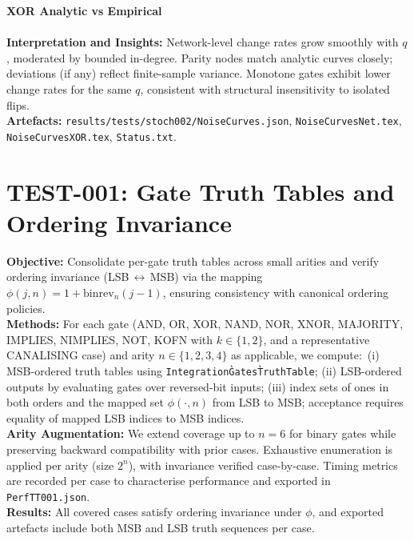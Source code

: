\documentclass{article}
\begin{document}
\textbf{XOR Analytic vs Empirical}\\
\\
\textbf{Interpretation and Insights:} Network-level change rates grow smoothly with \(q\), moderated by bounded in-degree. Parity nodes match analytic curves closely; deviations (if any) reflect finite-sample variance. Monotone gates exhibit lower change rates for the same \(q\), consistent with structural insensitivity to isolated flips.\\
\textbf{Artefacts:} \texttt{results/tests/stoch002/NoiseCurves.json}, \texttt{NoiseCurvesNet.tex}, \texttt{NoiseCurvesXOR.tex}, \texttt{Status.txt}.


\section{TEST-001: Gate Truth Tables and Ordering Invariance}
\textbf{Objective:} Consolidate per-gate truth tables across small arities and verify ordering invariance (LSB\,$\leftrightarrow$\,MSB) via the mapping $\phi(j,n)=1+\mathrm{binrev}_n(j-1)$, ensuring consistency with canonical ordering policies.\\
\textbf{Methods:} For each gate (AND, OR, XOR, NAND, NOR, XNOR, MAJORITY, IMPLIES, NIMPLIES, NOT, KOFN with $k\in\{1,2\}$, and a representative CANALISING case) and arity $n\in\{1,2,3,4\}$ as applicable, we compute:\
(i) MSB-ordered truth tables using \texttt{Integration\`Gates\`TruthTable}; (ii) LSB-ordered outputs by evaluating gates over reversed-bit inputs; (iii) index sets of ones in both orders and the mapped set $\phi(\cdot,n)$ from LSB to MSB; acceptance requires equality of mapped LSB indices to MSB indices.\\
\textbf{Arity Augmentation:} We extend coverage up to $n=6$ for binary gates while preserving backward compatibility with prior cases. Exhaustive enumeration is applied per arity (size $2^n$), with invariance verified case-by-case. Timing metrics are recorded per case to characterise performance and exported in \texttt{PerfTT001.json}.\\
\textbf{Results:} All covered cases satisfy ordering invariance under $\phi$, and exported artefacts include both MSB and LSB truth sequences per case.\\
\end{document}
